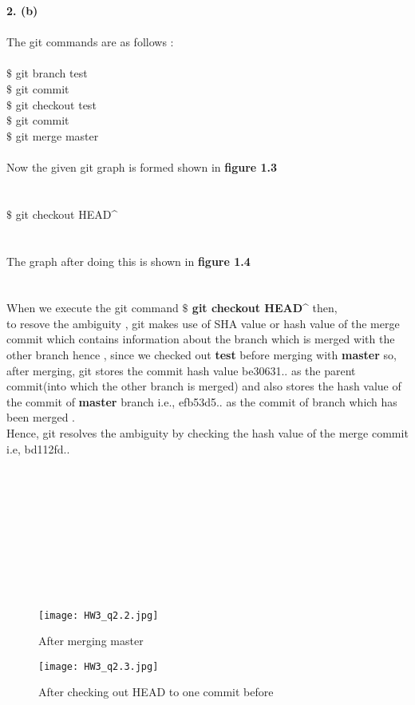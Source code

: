 \documentclass{article}
\theoremstyle{definition}
\begin{document}
\textbf{2. (b)}\\\\
The git commands are as follows : \\\\
$ \$ $ git branch test\\
$ \$ $ git commit\\
$ \$ $ git checkout test\\
$ \$ $ git commit\\
$ \$ $ git merge master\\\\
Now the given git graph is formed shown in \textbf{figure 1.3}\\\\\\
$ \$ $ git checkout HEAD\^{}\\\\\\
The graph after doing this is shown in \textbf{figure 1.4}\\\\\\
When we execute the git command \textbf{$ \$ $ git checkout HEAD\^{}} then,\\
to resove the ambiguity , git makes use of SHA value or hash value of the merge commit which contains information about the branch which is merged with the other branch hence ,
since we checked out \textbf{test} before merging with \textbf{master} so, after merging, git stores the commit hash value be30631..  as the parent commit(into which the other branch is merged) and also stores the hash value of the commit of \textbf{master} branch i.e., efb53d5.. as the commit of branch which has been merged .\\
Hence, git resolves the ambiguity by checking the hash value of the merge commit i.e, bd112fd.. \\\\\\\\\\\\\\\\\\\\

\begin{figure}
	
	\begin{center}
		\texttt{[image: HW3\_q2.2.jpg]} \caption{After merging master}
	\end{center}
	
	
\end{figure}

\begin{figure}
	
	\begin{center}
		\texttt{[image: HW3\_q2.3.jpg]} \caption{After checking out HEAD to one commit before}
	\end{center}
\end{figure}
\end{document}
